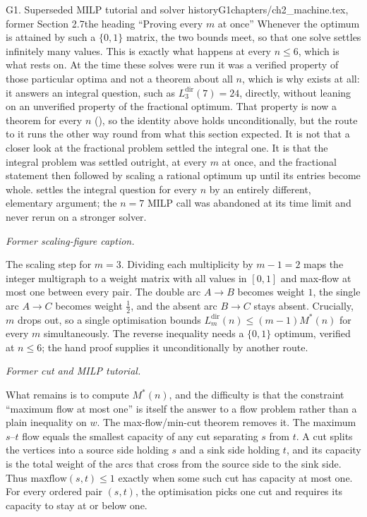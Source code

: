 \begin{offcutrewrite}{G1. Superseded MILP tutorial and solver history}{G1}{chapters/ch2\_machine.tex, former Section 2.7}{the heading ``Proving every $m$ at once''}
Whenever the optimum is attained by such a $\{0,1\}$ matrix, the two bounds meet, so that one solve settles infinitely many values. This is exactly what happens at every $n \le 6$, which is what  rests on. At the time these solves were run it was a verified property of those particular optima and not a theorem about all $n$, which is why  exists at all: it answers an integral question, such as $L_3^{\mathrm{dir}}(7) = 24$, directly, without leaning on an unverified property of the fractional optimum. That property is now a theorem for every $n$ (), so the identity above holds unconditionally, but the route to it runs the other way round from what this section expected. It is not that a closer look at the fractional problem settled the integral one. It is that the integral problem was settled outright, at every $m$ at once, and the fractional statement then followed by scaling a rational optimum up until its entries become whole.  settles the integral question for every $n$ by an entirely different, elementary argument; the $n = 7$ MILP call was abandoned at its time limit and never rerun on a stronger solver.

\noindent\emph{Former scaling-figure caption.}

The scaling step for $m = 3$. Dividing each multiplicity by $m - 1 = 2$ maps the integer multigraph to a weight matrix with all values in $[0, 1]$ and max-flow at most one between every pair. The double arc $A \to B$ becomes weight $1$, the single arc $A \to C$ becomes weight $\tfrac{1}{2}$, and the absent arc $B \to C$ stays absent. Crucially, $m$ drops out, so a single optimisation bounds $L_m^{\mathrm{dir}}(n) \le (m-1)M^*(n)$ for every $m$ simultaneously. The reverse inequality needs a $\{0,1\}$ optimum, verified at $n\le6$; the hand proof supplies it unconditionally by another route.

\noindent\emph{Former cut and MILP tutorial.}

What remains is to compute $M^{*}(n)$, and the difficulty is that the constraint ``maximum flow at most one'' is itself the answer to a flow problem rather than a plain inequality on $w$. The max-flow/min-cut theorem removes it. The maximum $s$--$t$ flow equals the smallest capacity of any cut separating $s$ from $t$. A cut splits the vertices into a source side holding $s$ and a sink side holding $t$, and its capacity is the total weight of the arcs that cross from the source side to the sink side. Thus $\mathrm{maxflow}(s,t)\le1$ exactly when some such cut has capacity at most one. For every ordered pair $(s,t)$, the optimisation picks one cut and requires its capacity to stay at or below one.


\end{offcutrewrite}
